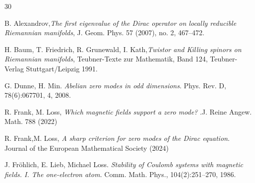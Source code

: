 \documentclass[11pt]{amsart}
\theoremstyle{plain}
\numberwithin{equation}{section}
\theoremstyle{plain}
\begin{document}
\begin{thebibliography}{30}

 B. Alexandrov,{\it The first eigenvalue of the Dirac operator on locally reducible Riemannian manifolds}, J. Geom. Phys. 57 (2007), no. 2, 467–472.






 H. Baum, T. Friedrich, R. Grunewald, I. Kath,{\it Twistor and Killing spinors on Riemannian manifolds}, Teubner-Texte zur Mathematik, Band 124, Teubner-Verlag Stuttgart/Leipzig 1991.



G. Dunne, H. Min. {\it Abelian zero modes in odd dimensions}. Phys. Rev. D, 78(6):067701, 4, 2008.


 R. Frank, M. Loss, {\it  Which magnetic fields support a zero mode?  }.J. Reine Angew. Math. 788 (2022)

 R. Frank,M. Loss, {\it A sharp criterion for zero modes of the Dirac equation}. Journal of the European Mathematical Society (2024)

J. Fröhlich, E. Lieb, Michael Loss. {\it Stability of Coulomb systems with magnetic fields. I.
The one-electron atom.} Comm. Math. Phys., 104(2):251–270, 1986.


\end{thebibliography}
\end{document}
